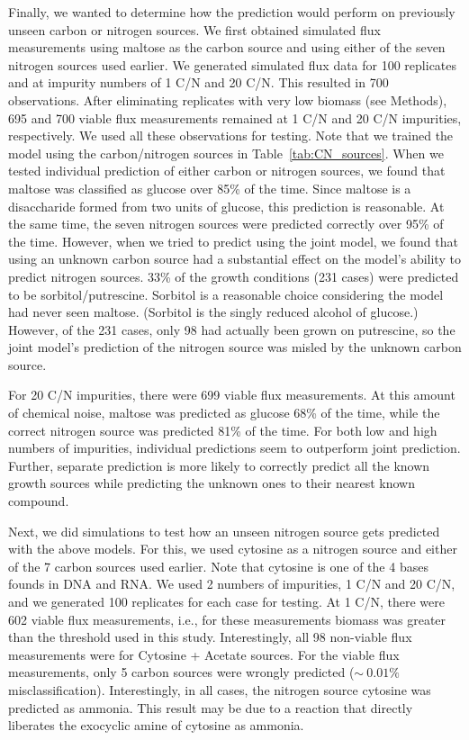 \documentclass[12pt]{article}
\begin{document}
Finally, we wanted to determine how the prediction would perform on previously unseen carbon or nitrogen sources. We first obtained simulated flux measurements using maltose as the carbon source and using either of the seven nitrogen sources used earlier. We generated simulated flux data for 100 replicates and at impurity numbers of 1 C/N and 20 C/N. This resulted in 700 observations. After eliminating replicates with very low biomass (see Methods), 695 and 700 viable flux measurements remained at 1 C/N and 20 C/N impurities, respectively. We used all these observations for testing. Note that we trained the model using the carbon/nitrogen sources in Table~\ref{tab:CN_sources}. When we tested individual prediction of either carbon or nitrogen sources, we found that maltose was classified as glucose over 85\% of the time. Since maltose is a disaccharide formed from two units of glucose, this prediction is reasonable. At the same time, the seven nitrogen sources were predicted correctly over 95\% of the time. However, when we tried to predict using the joint model, we found that using an unknown carbon source had a substantial effect on the model's ability to predict nitrogen sources. 33\% of the growth conditions (231 cases) were predicted to be sorbitol/putrescine. Sorbitol is a reasonable choice considering the model had never seen maltose. (Sorbitol is the singly reduced alcohol of glucose.) However, of the 231 cases, only 98 had actually been grown on putrescine, so the joint model's prediction of the nitrogen source was misled by the unknown carbon source.

For 20 C/N impurities, there were 699 viable flux measurements. At this amount of chemical noise, maltose was predicted as glucose 68\% of the time, while the correct nitrogen source was predicted 81\% of the time. For both low and high numbers of impurities, individual predictions seem to outperform joint prediction. Further, separate prediction is more likely to correctly predict all the known growth sources while predicting the unknown ones to their nearest known compound.

Next, we did simulations to test how an unseen nitrogen source gets predicted with the above models. For this, we used cytosine as a nitrogen source and either of the 7 carbon sources used earlier. Note that cytosine is one of the 4 bases founds in DNA and RNA. We used 2 numbers of impurities, 1 C/N and 20 C/N, and we generated 100 replicates for each case for testing. At 1 C/N, there were 602 viable flux measurements, i.e., for these measurements biomass was greater than the threshold used in this study. Interestingly, all 98 non-viable flux measurements were for Cytosine + Acetate sources. For the viable flux measurements, only 5 carbon sources were wrongly predicted ($\sim~0.01\%$ misclassification). Interestingly, in all cases, the nitrogen source cytosine was predicted as ammonia. This result may be due to a reaction that directly liberates the exocyclic amine of cytosine as ammonia.
\end{document}
